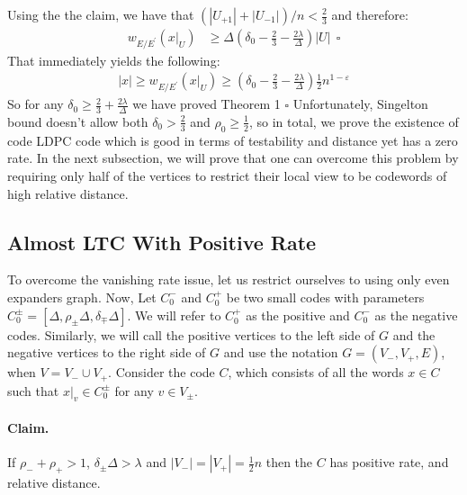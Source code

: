 \documentclass{article}
\begin{document}
\begin{multicols*}{2}
Using the the claim, we have that $\left( |U_{+1}| + |U_{-1}| \right)/n <\frac{2}{3} $ and therefore:
\begin{equation*}
  \begin{split}
    w_{E/E^{\prime}}\left( x|_{U} \right) & \ge \Delta\left( \delta_{0} - \frac{2}{3} - \frac{2\lambda}{\Delta} \right)|U| \ \  \square 
  \end{split}
\end{equation*}
That immediately yields the following: 
\begin{equation*}
  \begin{split}
    |x| \ge  w_{E/E^{\prime}}\left( x|_{U} \right) \ge \left( \delta_{0} - \frac{2}{3} - \frac{2\lambda}{\Delta} \right)\frac{1}{2}n^{1-\varepsilon} 
  \end{split}
\end{equation*}
So for any $\delta_0 \ge \frac{2}{3} + \frac{2\lambda}{\Delta} $ we have proved Theorem 1 $\square$
Unfortunately, Singelton bound doesn't allow both $\delta_0 > \frac{2}{3}$ and $\rho_0 \ge \frac{1}{2}$, so in total, we prove the existence of code LDPC code which is good in terms of testability and distance yet has a zero rate. In the next subsection, we will prove that one can overcome this problem by requiring only half of the vertices to restrict their local view to be codewords of high relative distance. 
\subsection{ Almost LTC With Positive Rate } 
To overcome the vanishing rate issue, let us restrict ourselves to using only even expanders graph. Now, Let $C_{0}^{-}$ and $C_{0}^{+}$ be two small codes with parameters $C_{0}^{\pm} = [\Delta, \rho_{\pm}\Delta, \delta_{\mp}\Delta]$. We will refer to $C_{0}^{+}$ as the positive and $C_{0}^{-}$ as the negative codes. Similarly, we will call the positive vertices to the left side of $G$ and the negative vertices to the right side of $G$ and use the notation $G = \left( V_{-}, V_{+}, E \right)$, when $V = V_{-} \cup V_{+}$. 
Consider the code $C$, which consists of all the words $x\in C$ such that $x|_{v} \in C_{0}^{\pm}$ for any $v \in V_{\pm}$.
\paragraph{Claim.} If $\rho_{-} + \rho_{+} > 1$, $\delta_{\pm}\Delta > \lambda$ and $|V_{-}| = |V_{+}| = \frac{1}{2}n$ then the $C$ has positive rate, and relative distance. 

\end{multicols*}
\end{document}

